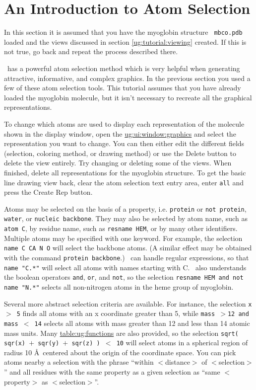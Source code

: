\section{An Introduction to Atom Selection}
In this section it is assumed that you have the myoglobin structure {\tt
mbco.pdb} loaded and the views discussed in section \ref{ug:tutorial:viewing}
created.  If this is not true, go back and repeat the process described there.

\VMD\ has a powerful atom selection method which is very
helpful when generating attractive, informative, and complex graphics.
In the previous section you used a few of these atom selection tools.
This tutorial assumes that you have already loaded the myoglobin
molecule, but it isn't necessary to recreate all the graphical
representations.

To change which atoms are used to display each representation of the
molecule shown in the display window, open the 
\hyperref{{\sf Graphics} window}{{\sf Graphics} window [\S~}{]}
{ug:ui:window:graphics} 
and select the representation you want to change.  
You can then either
edit the different fields (selection, coloring method, or drawing
method) or use the {\sf Delete} button to delete the view entirely.
Try changing or deleting some of the views.  When finished, delete all
representations for the myoglobin structure.  To get the basic line
drawing view back, clear the atom selection text entry area, enter {\tt all}
and press the {\sf Create Rep} button.

Atoms may be selected on the basis of a property, i.e. {\tt protein}
or {\tt not protein}, {\tt water}, or {\tt nucleic backbone}.  They
may also be selected by atom name, such as {\tt atom C}, by residue
name, such as {\tt resname HEM}, or by many other identifiers.
Multiple atoms may be specified with one keyword.  For example, the
selection {\tt name C CA N O} will select the backbone atoms.  (A
similar effect may be obtained with the command {\tt protein
backbone}.)  \VMD\ can handle regular expressions, so that {\tt name
"C.*"} will select all atoms with names starting with C.  \VMD\ also
understands the boolean operators {\tt and}, {\tt or}, and {\tt not},
so the selection {\tt resname HEM and not name "N.*"} selects all
non-nitrogen atoms in the heme group of myoglobin.

Several more abstract selection criteria are available.  For instance, the
selection {\tt x $>$ 5} finds all atoms with an x coordinate greater than 5,
while {\tt mass $>$12 and mass $<$ 14} selects all atoms with mass greater
than 12 and less than 14 atomic mass units.  Many \hyperref{math
functions}{math functions [\S~}{]}{table:ug:functions} are also provided, so
the selection {\tt sqrt( sqr(x) $+$ sqr(y) $+$ sqr(z) ) $<$ 10} will select
atoms in a spherical region of radius 10 \AA\ centered about the origin of
the coordinate space.  You can pick atoms nearby a selection with the phrase
``within $<$distance$>$ of $<$selection$>$'' and all residues with the same
property as a given selection as ``same $<$property$>$ as $<$selection$>$''.

